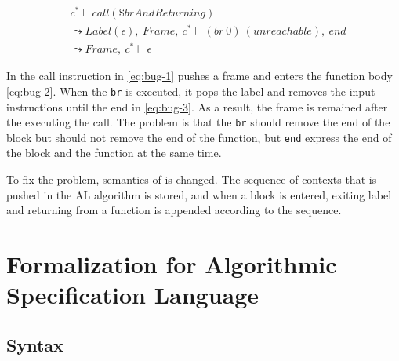 \begin{align}
  &c^* \vdash call(\$brAndReturning) \label{eq:bug-1} \\
&\leadsto
  Label(\epsilon), ~ Frame, ~ c^* \vdash (br ~ 0) ~ (unreachable), ~ end \label{eq:bug-2} \\
&\leadsto
  Frame, ~ c^* \vdash \epsilon \label{eq:bug-3}
\end{align}

In \spectecp{} the call instruction in \cref{eq:bug-1} pushes a frame and
enters the function body \cref{eq:bug-2}.
When the \texttt{br} is executed, it pops the label and removes the input
instructions until the end in \cref{eq:bug-3}.
As a result, the frame is remained after the executing the call.
The problem is that the \texttt{br} should remove the end of the block but
should not remove the end of the function, but \texttt{end} express the end of
the block and the function at the same time.


To fix the problem, semantics of \enteri is changed.
The sequence of contexts that is pushed in the AL algorithm is stored,
and when a block is entered, exiting label and returning from a function is
appended according to the sequence.


\section{Formalization for Algorithmic Specification Language}
\label{sec:formal}

\newcommand{\seq}[1]{#1^*}

\subsection{Syntax}
\label{syntax}

